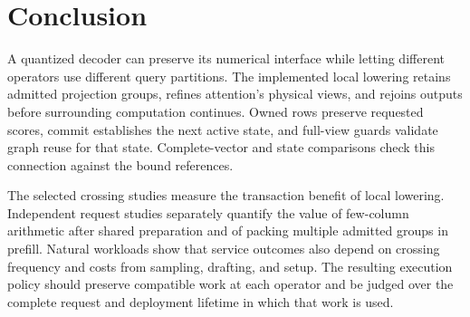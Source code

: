 \section{Conclusion}
\label{sec:conclusion}

A quantized decoder can preserve its numerical interface while letting different operators use different query partitions. The implemented local lowering retains admitted projection groups, refines attention's physical views, and rejoins outputs before surrounding computation continues. Owned rows preserve requested scores, commit establishes the next active state, and full-view guards validate graph reuse for that state. Complete-vector and state comparisons check this connection against the bound references.

The selected crossing studies measure the transaction benefit of local lowering. Independent request studies separately quantify the value of few-column arithmetic after shared preparation and of packing multiple admitted groups in prefill. Natural workloads show that service outcomes also depend on crossing frequency and costs from sampling, drafting, and setup. The resulting execution policy should preserve compatible work at each operator and be judged over the complete request and deployment lifetime in which that work is used.
